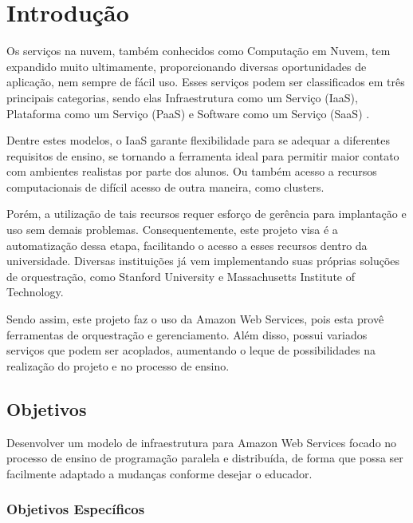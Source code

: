 \documentclass[tg]{mdtufsm}
\begin{document}
\tableofcontents
\listoffigures

\setlength{\baselineskip}{1.5\baselineskip}

\chapter{Introdução}


Os serviços na nuvem, também conhecidos como Computação em Nuvem, tem expandido muito ultimamente, proporcionando diversas oportunidades de aplicação, nem sempre de fácil uso. Esses serviços podem ser classificados em três principais categorias, sendo elas Infraestrutura como um Serviço (IaaS), Plataforma como um Serviço (PaaS) e Software como um Serviço (SaaS) \cite{xaas2}.

Dentre estes modelos, o IaaS garante flexibilidade para se adequar a diferentes requisitos de ensino, se tornando a ferramenta ideal para permitir maior contato com ambientes realistas por parte dos alunos. Ou também acesso a recursos computacionais de difícil acesso de outra maneira, como clusters. 

Porém, a utilização de tais recursos requer esforço de gerência para implantação e uso sem demais problemas. Consequentemente, este projeto visa é a automatização dessa etapa, facilitando o acesso a esses recursos dentro da universidade. Diversas instituições já vem implementando suas próprias soluções de orquestração, como Stanford University e Massachusetts Institute of Technology.

Sendo assim, este projeto faz o uso da Amazon Web Services, pois esta provê ferramentas de orquestração e gerenciamento. Além disso, possui variados serviços que podem ser acoplados, aumentando o leque de possibilidades na realização do projeto e no processo de ensino.

\section{Objetivos}

Desenvolver um modelo de infraestrutura para Amazon Web Services focado no processo de ensino de programação paralela e distribuída, de forma que possa ser facilmente adaptado a mudanças conforme desejar o educador.

\subsection{Objetivos Específicos}
\end{document}
